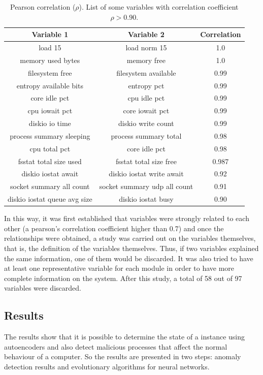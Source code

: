 \documentclass{iosart2c}
\begin{document}
\begin{table}[h!]
\begin{tabular}{ccc}
\hline
Variable 1 & Variable 2 & Correlation \\ \hline
load 15 & load norm 15 & 1.0\\ 
memory used bytes & memory free & 1.0\\ 
filesystem free & filesystem available & 0.99\\ 
entropy available bits & entropy pct & 0.99\\ 
core idle pct & cpu idle pct & 0.99\\ 
cpu iowait pct & core iowait pct & 0.99\\ 
diskio io time & diskio write count & 0.99\\ 
process summary sleeping & process summary total & 0.98\\ 
cpu total pct & core idle pct & 0.98\\ 
fsstat total size used & fsstat total size free & 0.987\\ 
diskio iostat await & diskio iostat write await & 0.92\\ 
socket summary all count & socket summary udp all count & 0.91\\ 
diskio iostat queue avg size & diskio iostat busy & 0.90\\ \hline

\end{tabular}
\label{tabla:sencilla}
\caption{Pearson correlation ($\rho$). List of some variables with correlation coefficient $\rho>0.90$.}
\end{table}

In this way, it was first established that variables were strongly related to each other (a pearson's correlation coefficient higher than 0.7) and once the relationships were obtained, a study was carried out on the variables themselves, that is, the definition of the variables themselves. Thus, if two variables explained the same information, one of them would be discarded. It was also tried to have at least one representative variable for each module in order to have more complete information on the system. After this study, a total of 58 out of 97 variables were discarded.


\subsection{Results}


The results show that it is possible to determine the state of a instance using autoencoders and also detect malicious processes that affect the normal behaviour of a computer. So the results are presented in two steps: anomaly detection results and evolutionary algorithms for neural networks.
\end{document}
